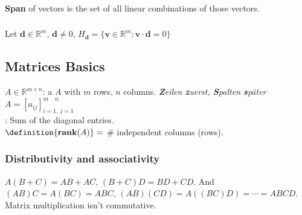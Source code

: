 \subsubsection{}
\textbf{Span} of vectors is the set of all linear combinations of those vectors.


\subsubsection{}
Let $\mathbf{d}\in \mathbb{R}^m$, $\mathbf{d} \ne 0$, $H_{\mathbf{d}} = \{\mathbf{v} \in \mathbb{R}^m : \mathbf{v} \cdot \mathbf{d} = 0\}$

\subsection{Matrices Basics}

$A \in \mathbb{R}^{m \times n}$: a  $A$ with $m$ rows, $n$ columns. {\tiny \textit{\textbf{Z}eilen \textbf{z}uerst, \textbf{S}palten \textbf{s}päter}}
$A=[a_{ij}]^{m\ \ \ \ \ n}_{i=1,\ j=1}$\\
: Sum of the diagonal entries.\\
$\definition{\textbf{rank}(A)} =$ \# independent columns (rows).



\subsubsection{Distributivity and associativity}
$A(B+C) = AB+AC$, $(B+C)D = BD+CD$.
And $(AB)C = A(BC) = ABC$, $(AB)(CD) = A((BC)D) = \cdots = ABCD$.
Matrix multiplication isn't commutative.


